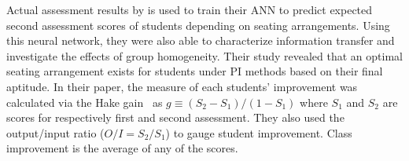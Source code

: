 \documentclass[twocolumn,secnumarabic,amssymb, nobibnotes, aps, prd]{revtex4-2}
\begin{document}




    Actual assessment results by \citet{roxas2010seating} is used to train their ANN to predict expected second assessment scores of students depending on seating arrangements.
    Using this neural network, they were also able to characterize information transfer and investigate the effects of group homogeneity. 
    Their study revealed that an optimal seating arrangement exists for students under PI methods based on their final aptitude.
    In their paper, the measure of each students' improvement was calculated via the Hake gain~\cite{hake1998} as 
    $g \equiv (S_2 - S_1) / (1 - S_1)$
    where $S_1$ and $S_2$ are scores for respectively first and second assessment.
    They also used the output/input ratio ($O/I = S_2/S_1$) to gauge student improvement.
    Class improvement is the average of any of the scores.
\end{document}
